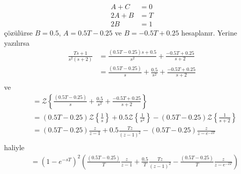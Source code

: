 \begin{enumerate}
\begin{equation}
        \begin{split}
            A+C&=0\\
            2A+B&=T\\
            2B&=1
        \end{split}
    \end{equation}
    çözülürse $B=0.5$, $A=0.5T-0.25$ ve $B=-0.5T+0.25$ hesaplanır. Yerine yazılırsa 
    \begin{equation}
        \begin{split}
            \frac{Ts+1}{s^2(s+2)}&=\frac{(0.5T-0.25)s+0.5}{s^2}+\frac{-0.5T+0.25}{s+2}\\
            &=\frac{(0.5T-0.25)}{s}+\frac{0.5}{s^2}+\frac{-0.5T+0.25}{s+2}\\
        \end{split}
    \end{equation}
    ve 
    \begin{equation}
        \begin{split}
            &=\mathcal{Z}\left\{\frac{(0.5T-0.25)}{s}+\frac{0.5}{s^2}+\frac{-0.5T+0.25}{s+2}\right\}\\
            &=(0.5T-0.25)\mathcal{Z}\left\{\frac{1}{s}\right\}+0.5\mathcal{Z}\left\{\frac{1}{s^2}\right\}-(0.5T-0.25)\mathcal{Z}\left\{\frac{1}{s+2}\right\}\\
            &=(0.5T-0.25)\frac{z}{z-1}+0.5\frac{Tz}{(z-1)^2}-(0.5T-0.25)\frac{z}{z-e^{-2T}}\\
        \end{split}
    \end{equation}
    haliyle
    \begin{equation}
        \begin{split}
            &=(1-e^{-sT})^2\left(\frac{(0.5T-0.25)}{T}\frac{z}{z-1}+\frac{0.5}{T}\frac{Tz}{(z-1)^2}-\frac{(0.5T-0.25)}{T}\frac{z}{z-e^{-2T}}\right)\\
        \end{split}
    \end{equation}
    
\end{enumerate}